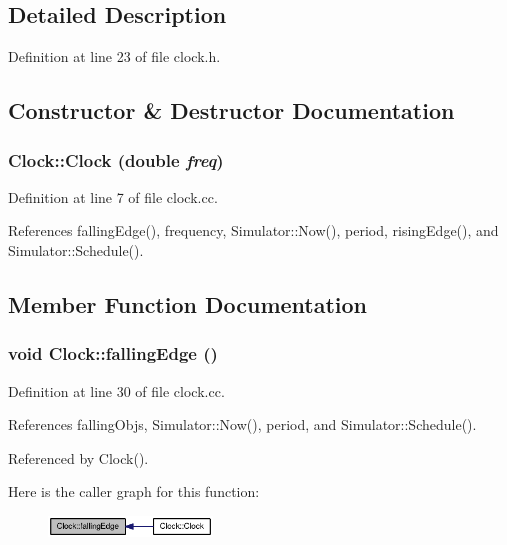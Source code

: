 \subsection{Detailed Description}


Definition at line 23 of file clock.h.

\subsection{Constructor \& Destructor Documentation}
\subsubsection[{Clock}]{\setlength{\rightskip}{0pt plus 5cm}Clock::Clock (double {\em freq})}\label{classClock_49d7d94582b08b480cfe22f835e5d24b}




Definition at line 7 of file clock.cc.

References fallingEdge(), frequency, Simulator::Now(), period, risingEdge(), and Simulator::Schedule().

\subsection{Member Function Documentation}
\subsubsection[{fallingEdge}]{\setlength{\rightskip}{0pt plus 5cm}void Clock::fallingEdge ()}\label{classClock_c1901911de32ed117b40b6e14168e084}




Definition at line 30 of file clock.cc.

References fallingObjs, Simulator::Now(), period, and Simulator::Schedule().

Referenced by Clock().

Here is the caller graph for this function:\nopagebreak
\begin{figure}[H]
\begin{center}
\leavevmode
\includegraphics[width=124pt]{classClock_c1901911de32ed117b40b6e14168e084_icgraph}
\end{center}
\end{figure}

